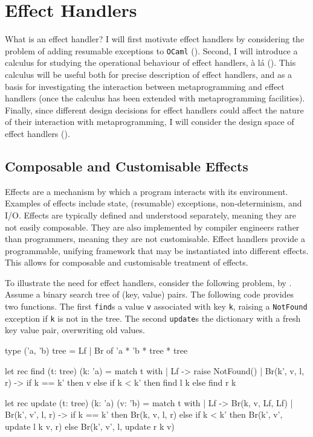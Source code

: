\section{Effect Handlers}\label{section:effects-technical}
What is an effect handler? I will first motivate effect handlers by considering the problem of adding resumable exceptions to \texttt{OCaml} (). Second, I will introduce a calculus for studying the operational behaviour of effect handlers, à lá \citet{pretnar-15} (). This calculus will be useful both for precise description of effect handlers, and as a basis for investigating the interaction between metaprogramming and effect handlers (once the calculus has been extended with metaprogramming facilities). Finally, since different design decisions for effect handlers could affect the nature of their interaction with metaprogramming, I will consider the design space of effect handlers ().

\subsection{Composable and Customisable Effects}\label{subsection:effect-handler-motivation}
Effects are a mechanism by which a program interacts with its environment. Examples of effects include state, (resumable) exceptions, non-determinism, and I/O. Effects are typically defined and understood separately, meaning they are not easily composable. They are also implemented by compiler engineers rather than programmers, meaning they are not customisable. Effect handlers provide a programmable, unifying framework that may be instantiated into different effects. This allows for composable and customisable treatment of effects.

To illustrate the need for effect handlers, consider the following problem, by \citet{kiselyov-2012}. Assume a binary search tree of (key, value) pairs. The following code provides two functions. The first \texttt{find}s a value \texttt{v} associated with key \texttt{k}, raising a \texttt{NotFound} exception if \texttt{k} is not in the tree. The second \texttt{update}s the dictionary with a fresh key value pair, overwriting old values.

\begin{ocaml}
type ('a, 'b) tree = Lf | Br of 'a * 'b * tree * tree 

let rec find (t: tree) (k: 'a) = match t with 
 | Lf -> raise NotFound()
 | Br(k', v, l, r) -> if k == k' then v 
                      else if k < k' then find l k
                           else find r k

let rec update (t: tree) (k: 'a) (v: 'b) = match t with 
  | Lf -> Br(k, v, Lf, Lf)
  | Br(k', v', l, r) -> if k == k' then Br(k, v, l, r)
                       else if k < k' then Br(k', v', update l k v, r)
                            else Br(k', v', l, update r k v)
\end{ocaml}

